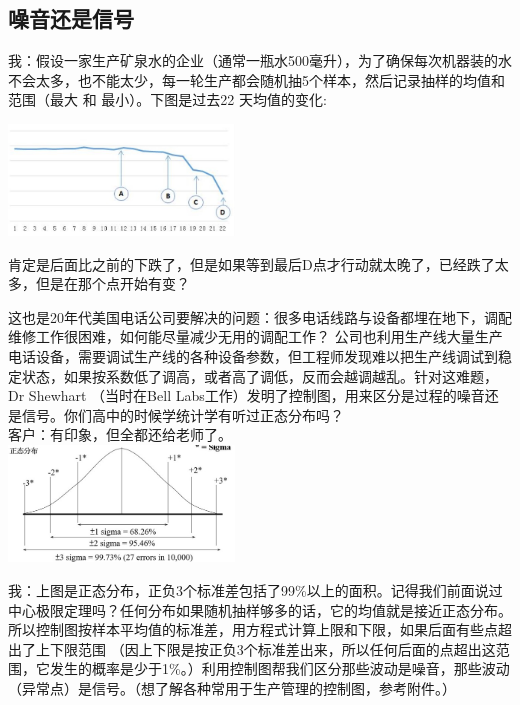 \hypertarget{ux566aux97f3ux8fd8ux662fux4fe1ux53f7}{%
\subsection{噪音还是信号}\label{ux566aux97f3ux8fd8ux662fux4fe1ux53f7}}

我：假设一家生产矿泉水的企业（通常一瓶水500毫升），为了确保每次机器装的水不会太多，也不能太少，每一轮生产都会随机抽5个样本，然后记录抽样的均值和范围（最大
和 最小）。下图是过去22 天均值的变化:


\includegraphics[width=6cm]{DistillWaterCC.jpg}

肯定是后面比之前的下跌了，但是如果等到最后D点才行动就太晚了，已经跌了太多，但是在那个点开始有变？

这也是20年代美国电话公司要解决的问题：很多电话线路与设备都埋在地下，调配维修工作很困难，如何能尽量减少无用的调配工作？
公司也利用生产线大量生产电话设备，需要调试生产线的各种设备参数，但工程师发现难以把生产线调试到稳定状态，如果按系数低了调高，或者高了调低，反而会越调越乱。针对这难题，Dr
Shewhart （当时在Bell
Labs工作）发明了控制图，用来区分是过程的噪音还是信号。你们高中的时候学统计学有听过正态分布吗？\\
客户：有印象，但全都还给老师了。\\

\includegraphics[width=6cm]{NormalDistPicture1.jpg}

我：上图是正态分布，正负3个标准差包括了99\%以上的面积。记得我们前面说过中心极限定理吗？任何分布如果随机抽样够多的话，它的均值就是接近正态分布。所以控制图按样本平均值的标准差，用方程式计算上限和下限，如果后面有些点超出了上下限范围
（因上下限是按正负3个标准差出来，所以任何后面的点超出这范围，它发生的概率是少于1\%。）利用控制图帮我们区分那些波动是噪音，那些波动（异常点）是信号。（想了解各种常用于生产管理的控制图，参考附件。）

